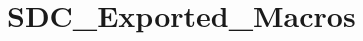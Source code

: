 \hypertarget{group___s_d_c___exported___macros}{}\section{S\+D\+C\+\_\+\+Exported\+\_\+\+Macros}
\label{group___s_d_c___exported___macros}
